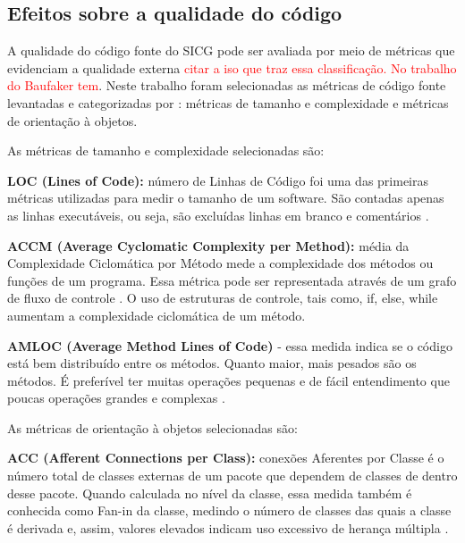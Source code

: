 \subsection[Efeitos sobre a qualidade do código]{Efeitos sobre a qualidade do código}

A qualidade do código fonte do SICG pode ser avaliada por meio de métricas que evidenciam a qualidade externa \textcolor{red}{citar a iso que traz essa classificação. No trabalho do Baufaker tem}. Neste trabalho foram selecionadas as métricas de código fonte levantadas e categorizadas por : métricas de tamanho e complexidade e métricas de orientação à objetos. 

As métricas de tamanho e complexidade selecionadas são: 

\textbf{LOC (Lines of Code):} número de Linhas de Código foi uma das primeiras métricas
utilizadas para medir o tamanho de um software. São contadas apenas as linhas
executáveis, ou seja, são excluídas linhas em branco e comentários \cite{Jones91}.

 \vspace{\onelineskip} 

\textbf{ACCM (Average Cyclomatic Complexity per Method):} média da Complexidade
Ciclomática por Método mede a complexidade dos métodos ou funções
de um programa. Essa métrica pode ser representada através de um grafo de fluxo
de controle \cite{McCabe76}. O uso de estruturas de controle, tais como, if, else,
while aumentam a complexidade ciclomática de um método.

 \vspace{\onelineskip}

\textbf{AMLOC (Average Method Lines of Code)} - essa medida indica se o código está bem distribuído entre os métodos. Quanto maior, mais pesados são os métodos. É preferível ter muitas operações pequenas e de fácil entendimento que poucas operações grandes e complexas \cite{Meirelles2013}.



 \vspace{\onelineskip} 

As métricas de orientação à objetos selecionadas são:

\textbf{ACC (Afferent Connections per Class):} conexões Aferentes por Classe é o número
total de classes externas de um pacote que dependem de classes de dentro desse
pacote. Quando calculada no nível da classe, essa medida também é conhecida como
Fan-in da classe, medindo o número de classes das quais a classe é derivada e, assim,
valores elevados indicam uso excessivo de herança múltipla \cite{McCabe94} \cite{Chidamber94}.

